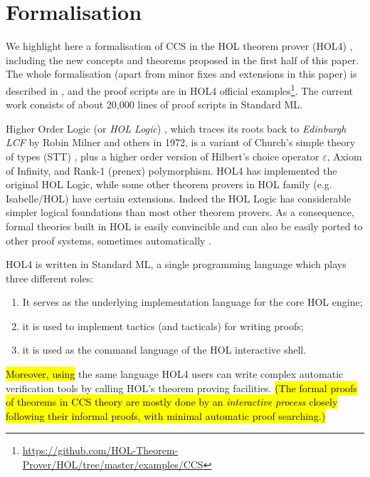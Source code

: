 \section{Formalisation}
\label{s:for}
We highlight here a formalisation of CCS
in the HOL theorem
prover (HOL4) \cite{slind2008brief},
including the new concepts and theorems proposed in the first half of
this paper.
The whole formalisation (apart from minor fixes and extensions in this
paper)
is described in \cite{Tian:2017wrba}, and the
proof scripts are in HOL4 official
examples\footnote{\url{https://github.com/HOL-Theorem-Prover/HOL/tree/master/examples/CCS}}. The
current work consists of about 20,000 lines of proof scripts in Standard ML.

Higher Order Logic (or \emph{HOL Logic}) \cite{hollogic}, which traces
its roots back to
\emph{Edinburgh LCF} by Robin Milner and others in 1972, is a variant of
Church’s simple theory of types (STT) \cite{church1940formulation},
plus a higher order version of Hilbert's choice operator $\varepsilon$,
Axiom of Infinity, and Rank-1 (prenex) polymorphism.
HOL4 has implemented the original HOL Logic, 
while some other theorem provers in HOL family (e.g. Isabelle/HOL) have
certain extensions.
Indeed the HOL Logic has considerable simpler logical
foundations than most other theorem provers. %
As a consequence,
formal theories built in HOL is easily convincible and can
also be easily ported to other proof systems,
sometimes automatically \cite{hurd2011opentheory}.

HOL4 is written in Standard ML, a single programming language which
plays three different roles:
\begin{enumerate}
\item It serves as the underlying implementation language for the core HOL engine;\vspace{-1ex}
\item it is used to implement tactics (and tacticals) for writing proofs;\vspace{-1ex}
\item it is used as the command language of the HOL interactive shell.
\end{enumerate}
\hl{Moreover, using} the same language HOL4 users can write complex automatic
verification tools by calling HOL's theorem proving
facilities. \hl{(The formal proofs of theorems in CCS theory
are mostly done by an \emph{interactive process} closely following
their informal proofs, with minimal automatic proof searching.)}

